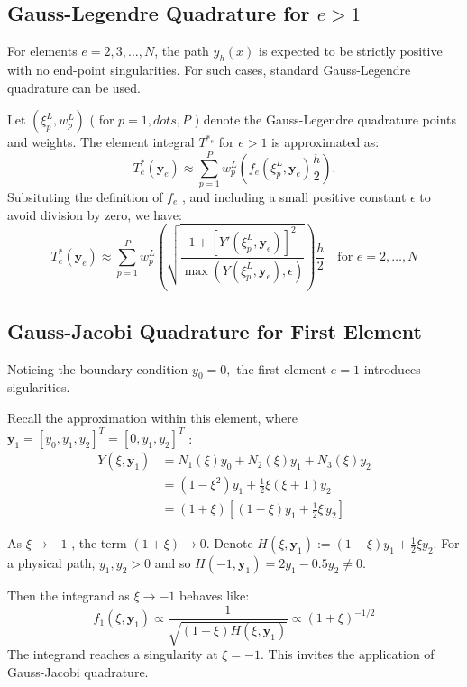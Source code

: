 \documentclass[12pt]{article}
\begin{document}
\subsection{Gauss-Legendre Quadrature for \( e > 1 \) }

For elements \( e = 2, 3, ..., N \), the path \(y_h(x) \)  is expected to be strictly positive with no end-point singularities. For such cases, standard Gauss-Legendre quadrature can be used. 

Let \( (\xi_{p}^{L}, w_{p}^{L}) \) ( for \( p = 1, dots, P \) ) denote the Gauss-Legendre quadrature points and weights. The element integral \( T^{*_e}  \) for \( e > 1 \) is approximated as:  
\[ 
    T_e^*(\mathbf{y}_e) \approx \sum_{p=1}^{P} w_{p}^{L} \left( f_e(\xi_{p}^{L}, \mathbf{y}_e) \frac{h}{2} \right).
\]
Subsituting the definition of \( f_e \) , and including a small positive constant \( \epsilon \) to avoid division by zero, we have: 
\[ 
    T_e^*(\mathbf{y}_e) \approx \sum_{p=1}^{P} w_{p}^{L} \left( \sqrt{\frac{1 + [Y'(\xi_{p}^{L}, \mathbf{y}_e)]^2}{ \max(Y(\xi_{p}^{L}, \mathbf{y}_e), \epsilon) }} \right) \frac{h}{2} \quad \text{for } e = 2, \ldots, N 
\]

\subsection{Gauss-Jacobi Quadrature for First Element}

Noticing the boundary condition \( y_{0} = 0, \) the first element \( e=1 \) introduces sigularities. 

Recall the approximation within this element, where \( \mathbf{y}_1 = [y_0, y_1, y_2]^T = [0, y_1, y_2]^T \) :
\begin{align*}
    Y(\xi, \mathbf{y}_1) &= N_1(\xi)y_0 + N_2(\xi)y_1 + N_3(\xi)y_2 \\
    &= (1 - \xi^2)y_1 + \frac{1}{2}\xi(\xi+1)y_2 \\
    &= (1 + \xi)\left[(1-\xi) y_{1} + \frac{1}{2} \xi \, y_{2}\right]
\end{align*}

As \( \xi \to -1 \) , the term \( (1+\xi) \to 0 \). Denote \( H(\xi, \mathbf{y}_1) := (1-\xi)y_1 + \frac{1}{2}\xi y_2 \). For a physical path, \( y_{1}, y_{2} > 0 \) and so \( H(-1, \mathbf{y}_1) = 2y_1 - 0.5y_2 \neq 0 \). 

Then the integrand as \( \xi \to -1 \) behaves like: 
\[ 
    f_1(\xi, \mathbf{y}_1) \propto \frac{1}{\sqrt{(1+\xi) H(\xi, \mathbf{y}_1)}} \propto (1+\xi)^{-1/2}     
\]
The integrand reaches a singularity at \( \xi = -1 \). This invites the application of Gauss-Jacobi quadrature. 
\end{document}

